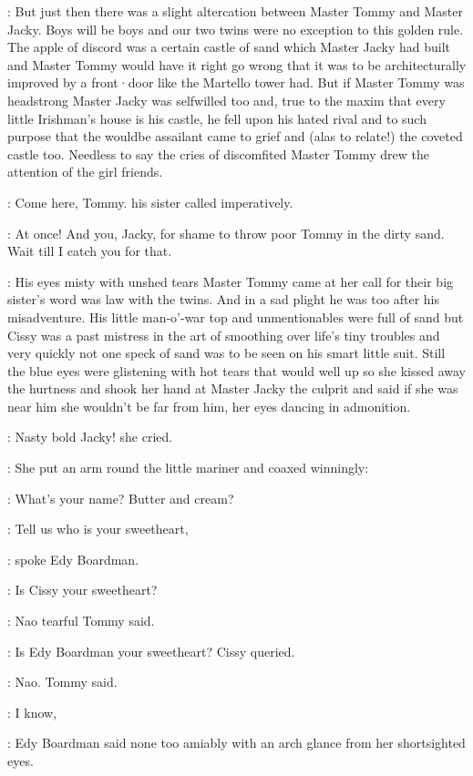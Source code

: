 :
But just then
there was a slight altercation
between Master Tommy and Master Jacky.
Boys will be boys
and our two twins
were no exception to this golden rule.
The apple of discord was a certain castle of sand
which Master Jacky had built
and Master Tommy would have it
right go wrong
that it was to be architecturally improved
by a front·door
like the Martello tower had.
But if Master Tommy was headstrong
Master Jacky was selfwilled too
and,
true to the maxim
that every little Irishman's house is his castle,
he fell upon his hated rival
and to such purpose
that the wouldbe assailant came to grief
and (alas to relate!)
the coveted castle too.
Needless to say
the cries of discomfited Master Tommy
drew the attention of the girl friends.

\cissy:
Come here,
Tommy.
his sister called imperatively.

\cissy:
At once!
And you,
Jacky,
for shame
to throw poor Tommy in the dirty sand.
Wait till I catch you for that.

:
His eyes misty with unshed tears
Master Tommy came at her call
for their big sister's word
was law with the twins.
And in a sad plight he was too
after his misadventure.
His little man-o'-war top and unmentionables
were full of sand
but Cissy was a past mistress
in the art of smoothing over life's tiny troubles
and very quickly
not one speck of sand was to be seen
on his smart little suit.
Still the blue eyes were glistening
with hot tears that would well up
so she kissed away the hurtness
and shook her hand at Master Jacky
the culprit
and said if she was near him
she wouldn't be far from him,
her eyes dancing in admonition.

\cissy:
Nasty bold Jacky!
she cried.

:
She put an arm round the little mariner
and coaxed winningly:

\cissy:
What's your name?
Butter and cream?

\edy:
Tell us who is your sweetheart,

:
spoke Edy Boardman.

\edy:
Is Cissy your sweetheart?

\tommy:
Nao
\stage{[tearfully]}
tearful Tommy said.

\cissy:
Is Edy Boardman your sweetheart?
Cissy queried.

\tommy:
Nao.
Tommy said.

\edy:
I know,

:
Edy Boardman said
none too amiably
with an arch glance from her shortsighted eyes.

